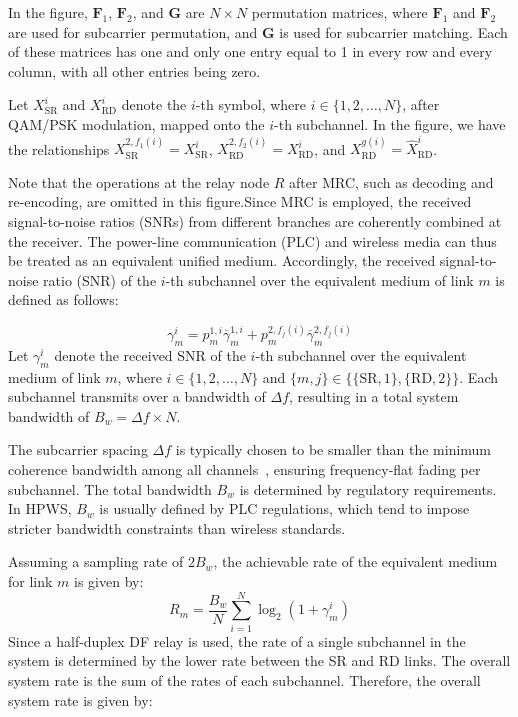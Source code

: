 \documentclass[lettersize,journal]{IEEEtran}
\begin{document}
	In the figure, \( \mathbf{F}_1 \), \( \mathbf{F}_2 \), and \( \mathbf{G} \) are \( N \times N \) permutation matrices, where \( \mathbf{F}_1 \) and \( \mathbf{F}_2 \) are used for subcarrier permutation, and \( \mathbf{G} \) is used for subcarrier matching. Each of these matrices has one and only one entry equal to 1 in every row and every column, with all other entries being zero.
	
	Let \( X_{\mathrm{SR}}^i \)  and \( X_{\mathrm{RD}}^i \) denote the \( i \)-th symbol, where \( i \in \{1, 2, \dots, N\} \), after QAM/PSK modulation, mapped onto the \( i \)-th subchannel. In the figure, we have the relationships \( X_{\mathrm{SR}}^{2, f_1(i)} = X_{\mathrm{SR}}^i \), \( X_{\mathrm{RD}}^{ 2, f_2(i)} = X_{\mathrm{RD}}^i \), and \( X_{\mathrm{RD}}^ {g(i)} = \hat{X}_{\mathrm{RD}}^i \).
	
	Note that the operations at the relay node \( R \) after MRC, such as decoding and re-encoding, are omitted in this figure.Since MRC is employed, the received signal-to-noise ratios (SNRs) from different branches are coherently combined at the receiver. The power-line communication (PLC) and wireless media can thus be treated as an equivalent unified medium. Accordingly, the received signal-to-noise ratio (SNR) of the \( i \)-th subchannel over the equivalent medium of link \( m \) is defined as follows:
	
	\begin{equation}
		\gamma _m^i = p_m^{1,i}\overline \gamma  _m^{1,i} + p_m^{2,{f_j}(i)}\overline \gamma  _m^{2,{f_j}(i)}
	\end{equation}
	Let \( \gamma_m^i \) denote the received SNR of the \( i \)-th subchannel over the equivalent medium of link \( m \), where \( i \in \{1, 2, \dots, N\} \) and \( \{m, j\} \in \{\{\mathrm{SR}, 1\}, \{\mathrm{RD}, 2\}\} \). Each subchannel transmits over a bandwidth of \( \Delta f \), resulting in a total system bandwidth of \( B_w = \Delta f \times N \).
	
	The subcarrier spacing \( \Delta f \) is typically chosen to be smaller than the minimum coherence bandwidth among all channels~\cite{9122404}, ensuring frequency-flat fading per subchannel. The total bandwidth \( B_w \) is determined by regulatory requirements. In HPWS, \( B_w \) is usually defined by PLC regulations, which tend to impose stricter bandwidth constraints than wireless standards.
	
	Assuming a sampling rate of \( 2B_w \), the achievable rate of the equivalent medium for link \( m \) is given by:
	\begin{equation}
		{R_m} = \frac{{{B_w}}}{N}\sum\limits_{i = 1}^N {{{\log }_2}(1 + \gamma _m^i)} 
	\end{equation}
	Since a half-duplex DF relay is used, the rate of a single subchannel in the system is determined by the lower rate between the SR and RD links. The overall system rate is the sum of the rates of each subchannel. Therefore, the overall system rate is given by:
	
\end{document}
